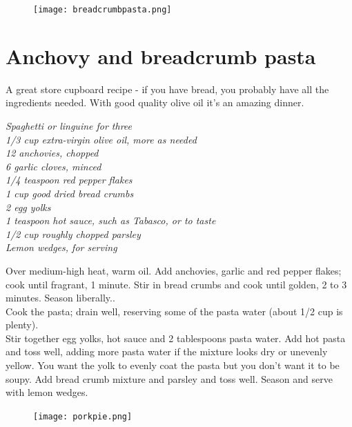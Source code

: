 \documentclass{tufte-book}
\begin{document}
\newpage

\begin{figure}[h]
  \texttt{[image: breadcrumbpasta.png]}
\end{figure}

\section{Anchovy and breadcrumb pasta }

A great store cupboard recipe - if you have bread, you probably have all the ingredients needed. With good quality olive oil it's an amazing dinner.

\smallskip
\emph{Spaghetti or linguine for three
\\1/3 cup extra-virgin olive oil, more as needed
\\12 anchovies, chopped
\\6 garlic cloves, minced
\\1/4 teaspoon red pepper flakes
\\1 cup good dried bread crumbs
\\2 egg yolks
\\1 teaspoon hot sauce, such as Tabasco, or to taste
\\1/2 cup roughly chopped parsley
\\Lemon wedges, for serving}

\smallskip
Over medium-high heat, warm oil. Add anchovies, garlic and red pepper flakes; cook until fragrant, 1 minute. Stir in bread crumbs and cook until golden, 2 to 3 minutes. Season liberally..
\\Cook the pasta; drain well, reserving some of the pasta water (about 1/2 cup is plenty). 
\\Stir together egg yolks, hot sauce and 2 tablespoons pasta water. Add hot pasta and toss well, adding more pasta water if the mixture looks dry or unevenly yellow. You want the yolk to evenly coat the pasta but you don't want it to be soupy. Add bread crumb mixture and parsley and toss well. Season and serve with lemon wedges.


\newpage

\begin{figure}[h]
  \texttt{[image: porkpie.png]}
\end{figure}
\end{document}
